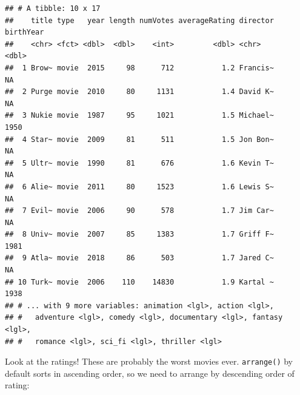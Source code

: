 \documentclass[]{book}
\newenvironment{Shaded}{\begin{snugshade}}{\end{snugshade}}
\newcommand{\DecValTok}[1]{\textcolor[rgb]{0.00,0.00,0.81}{#1}}
\newcommand{\KeywordTok}[1]{\textcolor[rgb]{0.13,0.29,0.53}{\textbf{#1}}}
\newcommand{\NormalTok}[1]{#1}
\newcommand{\OperatorTok}[1]{\textcolor[rgb]{0.81,0.36,0.00}{\textbf{#1}}}
\newcommand{\StringTok}[1]{\textcolor[rgb]{0.31,0.60,0.02}{#1}}
\begin{document}
\begin{verbatim}
## # A tibble: 10 x 17
##    title type   year length numVotes averageRating director birthYear
##    <chr> <fct> <dbl>  <dbl>    <int>         <dbl> <chr>        <dbl>
##  1 Brow~ movie  2015     98      712           1.2 Francis~        NA
##  2 Purge movie  2010     80     1131           1.4 David K~        NA
##  3 Nukie movie  1987     95     1021           1.5 Michael~      1950
##  4 Star~ movie  2009     81      511           1.5 Jon Bon~        NA
##  5 Ultr~ movie  1990     81      676           1.6 Kevin T~        NA
##  6 Alie~ movie  2011     80     1523           1.6 Lewis S~        NA
##  7 Evil~ movie  2006     90      578           1.7 Jim Car~        NA
##  8 Univ~ movie  2007     85     1383           1.7 Griff F~      1981
##  9 Atla~ movie  2018     86      503           1.7 Jared C~        NA
## 10 Turk~ movie  2006    110    14830           1.9 Kartal ~      1938
## # ... with 9 more variables: animation <lgl>, action <lgl>,
## #   adventure <lgl>, comedy <lgl>, documentary <lgl>, fantasy <lgl>,
## #   romance <lgl>, sci_fi <lgl>, thriller <lgl>
\end{verbatim}

Look at the ratings! These are probably the worst movies ever. \texttt{arrange()} by default sorts in ascending order, so we need to arrange by descending order of rating:

\begin{Shaded}
\end{Shaded}
\end{document}
